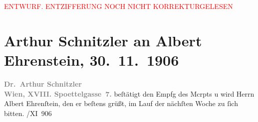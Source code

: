 
\begin{center}
            \textcolor{red}{ENTWURF. ENTZIFFERUNG NOCH NICHT KORREKTURGELESEN}
                      \end{center}
            
               \section[Arthur Schnitzler an Albert Ehrenstein, 30. 11. 1906]{ Arthur Schnitzler an Albert Ehrenstein, 30. 11. 1906}\nopagebreak{}\rehead{ }\begin{ledgroupsized}[t]{13cm}\normalsize\beginnumbering{} \toendnotes[C]{\smallbreak\pagebreak[2]} 
\pstart
           \noindent{}{\pb}\textcolor{gray}{\textbf{Dr. Arthur Schnitzler}}{\\}\textcolor{gray}{\textbf{Wien, XVIII. Spoettelgasse 7.}}\pend
           \pstart
           beſtätigt den Empfg des Mcrpts u wird Herrn Albert Ehrenſtein, den er beſtens
                    grüßt, im Lauf der nächſten Woche zu ſich bitten.\pend
           /XI 906\pend
           \endnumbering{}\end{ledgroupsized}  \newcommand{\dateiname}{L01641}\newcommand{\titel}{Arthur Schnitzler an Albert Ehrenstein, 30. 11. 1906}\newcommand{\editorInnen}{Martin Anton Müller und Gerd-Hermann Susen}
      